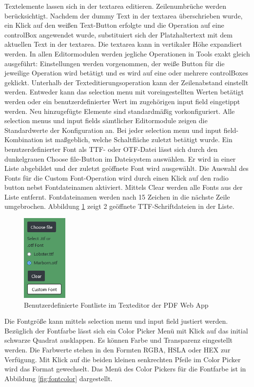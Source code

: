 Textelemente lassen sich in der textarea editieren. Zeilenumbrüche werden berücksichtigt. Nachdem der dummy Text in der textarea überschrieben wurde, ein Klick auf den weißen Text-Button erfolgte und die Operation auf eine controlBox angewendet wurde, substituiert sich der Platzhaltertext mit dem aktuellen Text in der textarea. Die textarea kann in vertikaler Höhe expandiert werden. In allen Editormodulen werden jegliche Operationen in Tools exakt gleich ausgeführt: Einstellungen werden vorgenommen, der weiße Button für die jeweilige Operation wird betätigt und es wird auf eine oder mehrere controlBoxes geklickt. Unterhalb der Texteditierungsoperation kann der Zeilenabstand einstellt werden. Entweder kann das selection menu mit voreingestellten Werten betätigt werden oder ein benutzerdefinierter Wert im zugehörigen input field eingetippt werden. Neu hinzugefügte Elemente sind standardmäßig vorkonfiguriert. Alle selection menus und input fields sämtlicher Editormodule zeigen die Standardwerte der Konfiguration an. Bei jeder selection menu und input field-Kombination ist maßgeblich, welche Schaltfläche zuletzt betätigt wurde. Ein benutzerdefinierter Font als TTF- oder OTF-Datei lässt sich durch den dunkelgrauen Choose file-Button im Dateisystem auswählen. Er wird in einer Liste abgebildet und der zuletzt geöffnete Font wird ausgewählt. Die Auswahl des Fonts für die Custom Font-Operation wird durch einen Klick auf den radio button nebst Fontdateinamen aktiviert. Mittels Clear werden alle Fonts aus der Liste entfernt. Fontdateinamen werden nach 15 Zeichen in die nächste Zeile umgebrochen. Abbildung \ref{fig:custom-font} zeigt 2 geöffnete TTF-Schriftdateien in der Liste.

\begin{figure}[!htbp]
	\centering
	\includegraphics[width=0.2\textwidth]{"images/custom-font.png"}
	\caption{Benutzerdefinierte Fontliste im Texteditor der PDF Web App}
	\label{fig:custom-font}
\end{figure}

Die Fontgröße kann mittels selection menu und input field justiert werden. Bezüglich der Fontfarbe lässt sich ein Color Picker Menü mit Klick auf das initial schwarze Quadrat ausklappen. Es können Farbe und Transparenz eingestellt werden. Die Farbwerte stehen in den Formten RGBA, HSLA oder HEX zur Verfügung. Mit Klick auf die beiden kleinen senkrechten Pfeile im Color Picker wird das Format gewechselt. Das Menü des Color Pickers für die Fontfarbe ist in Abbildung \ref{fig:fontcolor} dargestellt. 

